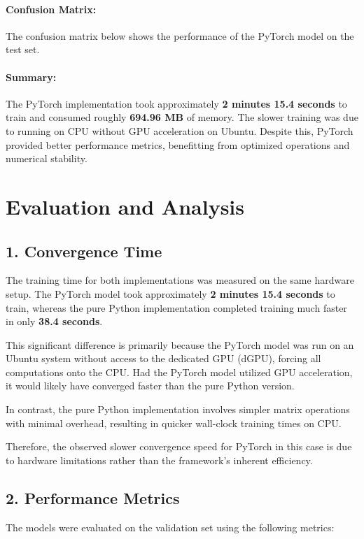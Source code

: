 \documentclass[12pt]{article}
\begin{document}

\paragraph{Confusion Matrix:}  
The confusion matrix below shows the performance of the PyTorch model on the test set.
\paragraph{Summary:}  
The PyTorch implementation took approximately \textbf{2 minutes 15.4 seconds} to train and consumed roughly \textbf{694.96 MB} of memory. The slower training was due to running on CPU without GPU acceleration on Ubuntu. Despite this, PyTorch provided better performance metrics, benefitting from optimized operations and numerical stability.

\section{Evaluation and Analysis}

\subsection{1. Convergence Time}
The training time for both implementations was measured on the same hardware setup. The PyTorch model took approximately \textbf{2 minutes 15.4 seconds} to train, whereas the pure Python implementation completed training much faster in only \textbf{38.4 seconds}.

This significant difference is primarily because the PyTorch model was run on an Ubuntu system without access to the dedicated GPU (dGPU), forcing all computations onto the CPU. Had the PyTorch model utilized GPU acceleration, it would likely have converged faster than the pure Python version.

In contrast, the pure Python implementation involves simpler matrix operations with minimal overhead, resulting in quicker wall-clock training times on CPU.

Therefore, the observed slower convergence speed for PyTorch in this case is due to hardware limitations rather than the framework’s inherent efficiency.

\subsection{2. Performance Metrics}
The models were evaluated on the validation set using the following metrics:
\end{document}
